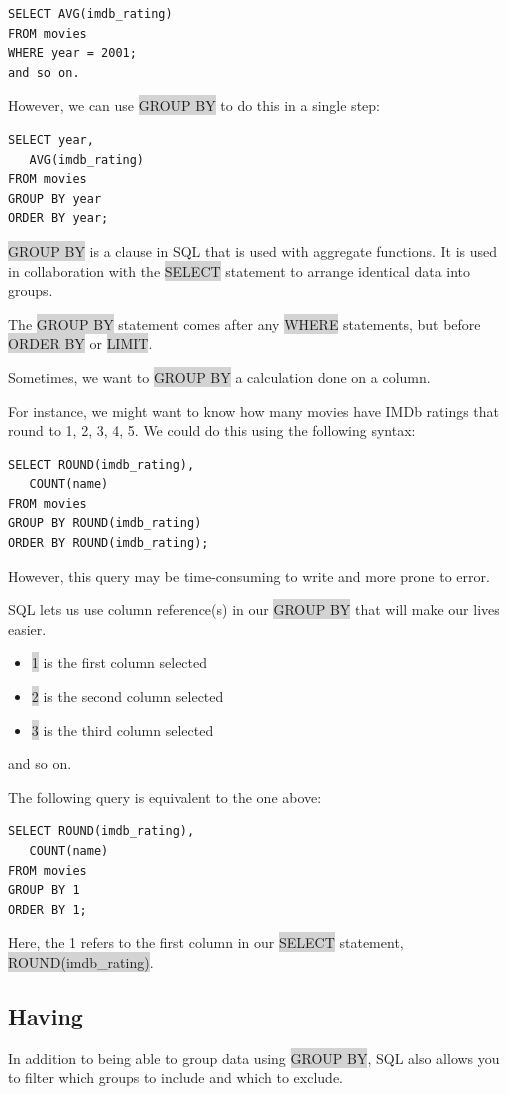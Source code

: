 \documentclass[11pt]{article}
\begin{document}
{{\begin{lstlisting}
SELECT AVG(imdb_rating)
FROM movies
WHERE year = 2001;
and so on.
\end{lstlisting}

However, we can use \colorbox{lightgray}{GROUP BY} to do this in a single step:
\begin{lstlisting}
SELECT year,
   AVG(imdb_rating)
FROM movies
GROUP BY year
ORDER BY year;
\end{lstlisting}
\colorbox{lightgray}{GROUP BY} is a clause in SQL that is used with aggregate functions. It is used in collaboration with the \colorbox{lightgray}{SELECT} statement to arrange identical data into groups.

The \colorbox{lightgray}{GROUP BY} statement comes after any \colorbox{lightgray}{WHERE} statements, but before \colorbox{lightgray}{ORDER BY} or \colorbox{lightgray}{LIMIT}.

Sometimes, we want to \colorbox{lightgray}{GROUP BY} a calculation done on a column.

For instance, we might want to know how many movies have IMDb ratings that round to 1, 2, 3, 4, 5. We could do this using the following syntax:
\begin{lstlisting}
SELECT ROUND(imdb_rating),
   COUNT(name)
FROM movies
GROUP BY ROUND(imdb_rating)
ORDER BY ROUND(imdb_rating);
\end{lstlisting}
However, this query may be time-consuming to write and more prone to error.

SQL lets us use column reference(s) in our \colorbox{lightgray}{GROUP BY} that will make our lives easier.
\begin{itemize}[leftmargin = *]
\item \colorbox{lightgray}{1} is the first column selected
\item \colorbox{lightgray}{2} is the second column selected
\item \colorbox{lightgray}{3} is the third column selected
\end{itemize}
and so on.

The following query is equivalent to the one above:
\begin{lstlisting}
SELECT ROUND(imdb_rating),
   COUNT(name)
FROM movies
GROUP BY 1
ORDER BY 1;
\end{lstlisting}
Here, the 1 refers to the first column in our \colorbox{lightgray}{SELECT} statement, \colorbox{lightgray}{ROUND(imdb\_rating)}.

\subsection{Having}
In addition to being able to group data using \colorbox{lightgray}{GROUP BY}, SQL also allows you to filter which groups to include and which to exclude.

}}
\end{document}
